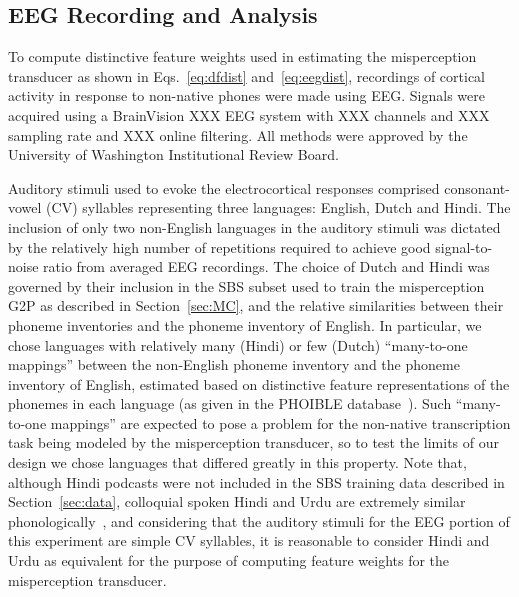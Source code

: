 \subsection{EEG Recording and Analysis}
To compute distinctive feature weights used in estimating the misperception
transducer as shown in Eqs.~\ref{eq:dfdist} and~\ref{eq:eegdist},
recordings of cortical activity in response to non-native phones were
made using EEG. Signals were acquired using a BrainVision XXX EEG system 
with XXX channels and XXX sampling rate and XXX online filtering.
All methods were approved by the University of Washington Institutional
Review Board.

Auditory stimuli used to evoke the electrocortical responses comprised
consonant-vowel (CV) syllables representing three languages: English,
Dutch and Hindi. The inclusion of only two non-English languages in the
auditory stimuli was dictated by the relatively high number of
repetitions required to achieve good signal-to-noise ratio from averaged
EEG recordings. The choice of Dutch and Hindi was governed by their
inclusion in the SBS subset used to train the misperception G2P as
described in Section~\ref{sec:MC}, and the relative similarities
between their phoneme inventories and the phoneme inventory of English.
In particular, we chose languages with relatively many (Hindi) or few
(Dutch) ``many-to-one mappings'' between the non-English phoneme
inventory and the phoneme inventory of English, estimated based on 
distinctive feature representations of the phonemes in each language 
(as given in the PHOIBLE database~\cite{PHOIBLE}). Such 
``many-to-one mappings'' are expected to pose a problem for the 
non-native transcription task being modeled by the misperception 
transducer, so to test the limits of our design we chose languages that 
differed greatly in this property. 
Note that, although Hindi podcasts were not included in the SBS training
data described in Section~\ref{sec:data}, colloquial spoken Hindi and
Urdu are extremely similar phonologically~\cite{Kachru90}, and
considering that the auditory stimuli for the EEG portion of this
experiment are simple CV syllables, it is reasonable to consider Hindi
and Urdu as equivalent for the purpose of computing feature weights for
the misperception transducer.

